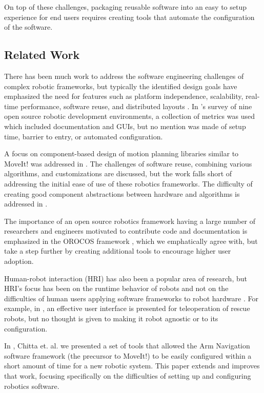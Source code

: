 \documentclass[10pt,journal,compsoc]{joser1}
\begin{document}
{On top of these challenges, packaging reusable software into an easy to setup experience for end users requires creating tools that automate the configuration of the software.

\subsection{Related Work}

There has been much work to address the software engineering challenges of
complex robotic frameworks, but typically the identified design goals have
emphasized the need for features such as platform independence, scalability,
real-time performance, software reuse, and distributed layouts
\cite{realtime_framework, collett2005player, kramer2007development}. In
\cite{kramer2007development}'s survey of nine open source robotic development
environments, a collection of metrics was used which included documentation and
GUIs, but no mention was made of setup time, barrier to entry, or automated
configuration.

A focus on component-based design of motion planning libraries similar to MoveIt! was addressed in \cite{brugali2010component}. The challenges of software reuse, combining various algorithms, and customizations are discussed, but the work falls short of addressing the initial ease of use of these robotics frameworks. The difficulty of creating good component abstractions between hardware and algorithms is addressed in \cite{kchir2013top}. 


The importance of an open source robotics framework having a large number of
researchers and engineers motivated to contribute code and documentation is
emphasized in the OROCOS framework \cite{bruyninckx2001open}, which we
emphatically agree with, but take a step further by creating additional tools to
encourage higher user adoption.
  
Human-robot interaction (HRI) has also been a popular area of research, but
HRI's focus has been on the runtime behavior of robots and not on the
difficulties of human users applying software frameworks to robot hardware
\cite{hci_metrics, yancotaxonomy, goodrichseven}. For example, in
\cite{rescueRobots}, an effective user interface is presented for teleoperation
of rescue robots, but no thought is given to making it robot agnostic or to its
configuration. 

In \cite{chitta2012perception}, Chitta et. al. we presented a set of tools that
allowed the Arm Navigation software framework (the precursor to MoveIt!) to be
easily configured within a short amount of time for a new robotic system. This
paper extends and improves that work, focusing specifically on the difficulties
of setting up and configuring robotics software.

}
\end{document}
